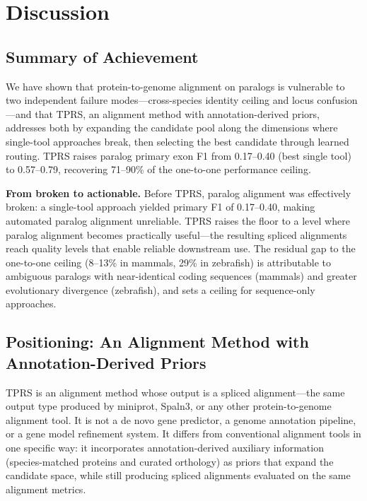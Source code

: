 \section{Discussion}

\subsection{Summary of Achievement}

We have shown that protein-to-genome alignment on paralogs is vulnerable to two independent failure modes---cross-species identity ceiling and locus confusion---and that TPRS, an alignment method with annotation-derived priors, addresses both by expanding the candidate pool along the dimensions where single-tool approaches break, then selecting the best candidate through learned routing. TPRS raises paralog primary exon F1 from 0.17--0.40 (best single tool) to 0.57--0.79, recovering 71--90\% of the one-to-one performance ceiling.

\textbf{From broken to actionable.} Before TPRS, paralog alignment was effectively broken: a single-tool approach yielded primary F1 of 0.17--0.40, making automated paralog alignment unreliable. TPRS raises the floor to a level where paralog alignment becomes practically useful---the resulting spliced alignments reach quality levels that enable reliable downstream use. The residual gap to the one-to-one ceiling (8--13\% in mammals, 29\% in zebrafish) is attributable to ambiguous paralogs with near-identical coding sequences (mammals) and greater evolutionary divergence (zebrafish), and sets a ceiling for sequence-only approaches.

\subsection{Positioning: An Alignment Method with Annotation-Derived Priors}

TPRS is an alignment method whose output is a spliced alignment---the same output type produced by miniprot, Spaln3, or any other protein-to-genome alignment tool. It is not a de novo gene predictor, a genome annotation pipeline, or a gene model refinement system. It differs from conventional alignment tools in one specific way: it incorporates annotation-derived auxiliary information (species-matched proteins and curated orthology) as priors that expand the candidate space, while still producing spliced alignments evaluated on the same alignment metrics.

